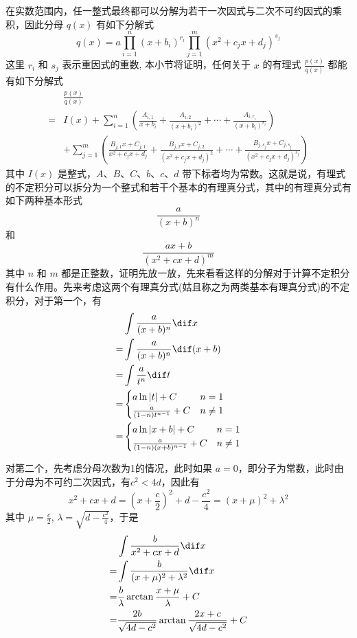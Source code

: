 在实数范围内，任一整式最终都可以分解为若干一次因式与二次不可约因式的乘积，因此分母 $q(x)$ 有如下分解式
\[ q(x) = a \prod_{i=1}^n(x+b_i)^{r_i} \prod_{j=1}^m(x^2+c_j x + d_j)^{s_j} \]
这里 $r_i$ 和 $s_j$ 表示重因式的重数, 本小节将证明，任何关于 $x$ 的有理式 $ \frac{p(x)}{q(x)} $ 都能有如下分解式
\begin{align*}
 & \frac{p(x)}{q(x)} \\
 = & I(x) + \sum_{i=1}^{n} \left( \frac{A_{i,1}}{x+b_i} + \frac{A_{i,2}}{(x+b_i)^2} + \cdots + \frac{A_{i,r_i}}{(x+b_i)^{r_i}}  \right) \\
 & + \sum_{j=1}^m \left( \frac{B_{j,1}x+C_{j,1}}{x^2+c_j x + d_j} + \frac{B_{j,2}x+C_{j,2}}{(x^2+c_j x + d_j)^2} + \cdots + \frac{B_{j,s_j}x+C_{j,s_j}}{(x^2+c_j x + d_j)^{s_j}} \right)
\end{align*}
其中 $I(x)$ 是整式，$A$、$B$、$C$、$b$、$c$、$d$ 带下标者均为常数。这就是说，有理式的不定积分可以拆分为一个整式和若干个基本的有理真分式，其中的有理真分式有如下两种基本形式
\[ \frac{a}{(x+b)^n} \]
和
\[ \frac{ax+b}{(x^2+cx+d)^m}  \]
其中 $n$ 和 $m$ 都是正整数，证明先放一放，先来看看这样的分解对于计算不定积分有什么作用。先来考虑这两个有理真分式(姑且称之为两类基本有理真分式)的不定积分，对于第一个，有
\begin{align*}
 & \int \frac{a}{(x+b)^n} \dif x \\
 = & \int \frac{a}{(x+b)^n}  \dif (x+b) \\
 = &\int \frac{a}{t^n} \dif t \\
 = & 
 \begin{cases}
    a\ln|t| + C & n=1 \\
    \frac{a}{(1-n)t^{n-1}} + C & n \neq 1
 \end{cases} \\
 = &
  \begin{cases}
    a\ln{|x+b|} + C & n=1 \\
    \frac{a}{(1-n)(x+b)^{n-1}} + C & n \neq 1
 \end{cases} \\
\end{align*}

对第二个，先考虑分母次数为1的情况，此时如果 $a=0$，即分子为常数，此时由于分母为不可约二次因式，有$c^2<4d$，因此有
\[ x^2+cx+d=\left(x+\frac{c}{2}\right)^2+d-\frac{c^2}{4} = (x+\mu)^2+\lambda^2 \]
其中 $\mu = \frac{c}{2}$, $\lambda = \sqrt{d-\frac{c^2}{4}}$，于是
\begin{align*}
 &  \int \frac{b}{x^2+cx+d} \dif x \\
  = & \int \frac{b}{(x+\mu)^2+\lambda^2} \dif x \\
  = & \frac{b}{\lambda} \arctan{\frac{x+\mu}{\lambda}} + C \\
  = & \frac{2b}{\sqrt{4d-c^{2}}} \arctan{\frac{2x+c}{\sqrt{4d-c^2}}} + C
\end{align*}

